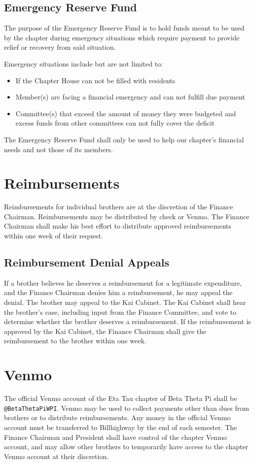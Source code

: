 \subsection{Emergency Reserve Fund}
\label{sec:emergency-reserve-fund}

The purpose of the Emergency Reserve Fund is to hold funds meant to be used by
the chapter during emergency situations which require payment to provide relief
or recovery from said situation.

Emergency situations include but are not limited to:
\begin{itemize}
    \item If the Chapter House can not be filled with residents
    \item Member(s) are facing a financial emergency and can not fulfill due
        payment
    \item Committee(s) that exceed the amount of money they were budgeted and
        excess funds from other committees can not fully cover the deficit
\end{itemize}

The Emergency Reserve Fund shall only be used to help our chapter's financial
needs and not those of its members.

\section{Reimbursements}

Reimbursements for individual brothers are at the discretion of the Finance
Chairman.
Reimbursements may be distributed by check or Venmo.
The Finance Chairman shall make his best effort to distribute approved
reimbursements within one week of their request.

\subsection{Reimbursement Denial Appeals}

If a brother believes he deserves a reimbursement for a legitimate expenditure,
and the Finance Chairman denies him a reimbursement, he may appeal the denial.
The brother may appeal to the Kai Cabinet.
The Kai Cabinet shall hear the brother’s case, including input from the Finance
Committee, and vote to determine whether the brother deserves a reimbursement.
If the reimbursement is approved by the Kai Cabinet, the Finance Chairman shall
give the reimbursement to the brother within one week.

\section{Venmo}

The official Venmo account of the Eta Tau chapter of Beta Theta Pi shall be
\texttt{@BetaThetaPiWPI}.
Venmo may be used to collect payments other than dues from brothers or to
distribute reimbursements.
Any money in the official Venmo account must be transferred to Billhighway by
the end of each semester.
The Finance Chairman and President shall have control of the chapter Venmo
account, and may allow other brothers to temporarily have access to the chapter
Venmo account at their discretion.

